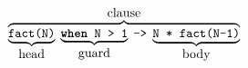 \documentclass[11pt]{article}
\newcommand\erlcode[1]{\texttt{#1}}
\begin{document}
\thispagestyle{empty}
\[
\overbrace{\underbrace{\erlcode{fact(N)}}_{\textrm{\normalsize head}} \; \underbrace{\erlcode{\textbf{when} N > 1}}_{\textrm{\normalsize guard}} \; \erlcode{->} \; \underbrace{\erlcode{N * fact(N-1)}}_{\textrm{\normalsize body}}}^{\textrm{\normalsize clause}}
\]
\end{document}
